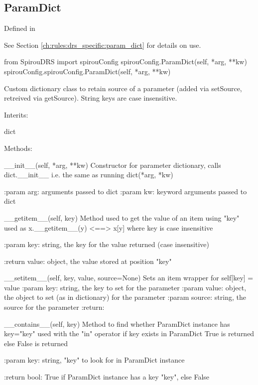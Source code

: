 \noindent\begin{minipage}{\textwidth}
\subsection{ParamDict}
\label{ch:the_module:spirouConfig:ParamDict}

Defined in \spirouConfig{}

See Section \ref{ch:rules:drs_specific:param_dict} for details on use.

\begin{pythonbox}
from SpirouDRS import spirouConfig
spirouConfig.ParamDict(self, *arg, **kw)
spirouConfig.spirouConfig.ParamDict(self, *arg, **kw)
\end{pythonbox}

\begin{pythondocstring}
Custom dictionary class to retain source of a parameter (added via setSource,
retreived via getSource). String keys are case insensitive.

Interits:

	dict

Methods:

	__init__(self, *arg, **kw)
	        Constructor for parameter dictionary, calls dict.__init__
	        i.e. the same as running dict(*arg, *kw)

	        :param arg: arguments passed to dict
	        :param kw: keyword arguments passed to dict

	__getitem__(self, key)
	        Method used to get the value of an item using "key"
	        used as x.__getitem__(y) <==> x[y]
	        where key is case insensitive

	        :param key: string, the key for the value returned (case insensitive)

	        :return value: object, the value stored at position "key"

 	__setitem__(self, key, value, source=None)
	        Sets an item wrapper for self[key] = value
	        :param key: string, the key to set for the parameter
	        :param value: object, the object to set (as in dictionary) for the
	                      parameter
	        :param source: string, the source for the parameter
	        :return:

	__contains__(self, key)
	        Method to find whether ParamDict instance has key="key"
	        used with the "in" operator
	        if key exists in ParamDict True is returned else False is returned

	        :param key: string, "key" to look for in ParamDict instance

	        :return bool: True if ParamDict instance has a key "key", else False

\end{pythondocstring}
\end{minipage}

